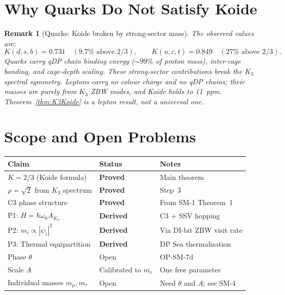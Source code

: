 \documentclass[11pt]{article}
\newtheorem{remark}{Remark}[section]
\begin{document}
\section{Why Quarks Do Not Satisfy Koide}

\begin{remark}[Quarks: Koide broken by strong-sector mass]
\label{rem:quarks}
The observed values are:
\[
K(d,s,b) = 0.731 \quad(9.7\%\text{ above }2/3), \qquad
K(u,c,t) = 0.849 \quad(27\%\text{ above }2/3).
\]
Quarks carry qDP chain binding energy ($\sim\!99\%$ of proton mass),
inter-cage bonding, and cage-depth scaling.  These strong-sector
contributions break the $K_3$ spectral symmetry.  Leptons carry no
colour charge and no qDP chains; their masses are purely from $K_3$
ZBW modes, and Koide holds to 11~ppm.
Theorem~\ref{thm:K3Koide} is a lepton result, not a universal one.
\end{remark}

\section{Scope and Open Problems}

\begin{center}
\renewcommand{\arraystretch}{1.2}
\begin{tabular}{p{5.5cm}lp{5cm}}
\toprule
Claim & Status & Notes \\
\midrule
$K = 2/3$ (Koide formula) & \textbf{Proved} & Main theorem \\
$\rho = \sqrt{2}$ from $K_3$ spectrum & \textbf{Proved} & Step~3 \\
C3 phase structure & \textbf{Proved} & From SM-1 Theorem~1 \\
P1: $H = \hbar\omega_0 A_{K_3}$ & \textbf{Derived} & C3 + SSV hopping \\
P2: $m_i \propto |\psi_i|^2$ & \textbf{Derived} & Via DI-bit ZBW visit rate \\
P3: Thermal equipartition & \textbf{Derived} & DP Sea thermalisation \\
Phase $\theta$ & Open & OP-SM-7d \\
Scale $A$ & Calibrated to $m_e$ & One free parameter \\
Individual masses $m_\mu, m_\tau$ & Open & Need $\theta$ and $A$; see SM-4 \\
\bottomrule
\end{tabular}
\end{center}
\end{document}
